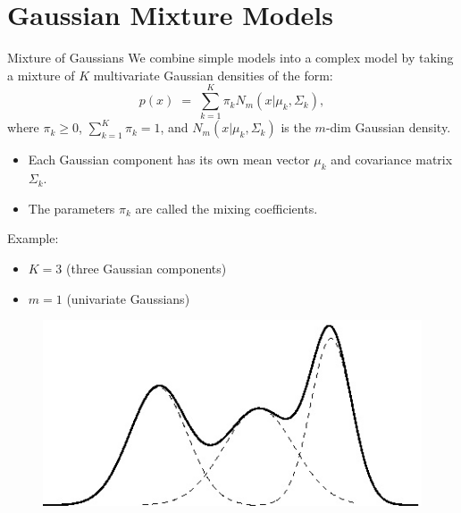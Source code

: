\documentclass[11pt,handout,aspectratio=169]{beamer}
\begin{document}
\section{Gaussian Mixture Models}

\begin{frame}{Mixture of Gaussians}
We combine simple models into a complex model by taking a mixture of $K$ multivariate Gaussian densities of the form:
$$
p(x)\;=\;\sum_{k=1}^K \pi_k N_m(x|\mu_k,\Sigma_k),
$$
where $\pi_k\geq 0$, $\sum_{k=1}^K\pi_k=1$, and $N_m(x|\mu_k,\Sigma_k)$ is the $m$-dim Gaussian density.
\begin{itemize}
	\item Each Gaussian component has its own mean vector $\mu_k$ and covariance matrix $\Sigma_k$.
	\item The parameters $\pi_k$ are called the mixing coefficients.
\end{itemize}
\pause
\begin{minipage}{7cm}{}
Example:
\begin{itemize}
	\item $K=3$ (three Gaussian components)
	\item $m=1$ (univariate Gaussians)
\end{itemize}
\end{minipage}\begin{minipage}{5cm}{}
	\begin{figure}
\includegraphics[scale=.25]{./pics/multimodal.jpg}
\end{figure}
\end{minipage}
\end{frame}
\end{document}
